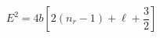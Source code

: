 \begin{equation}                                
E^{2}=4b[2(n_{r}-1)+\ell+\frac{3}{2}]  \label{eq:regge}                                
\end{equation} 
